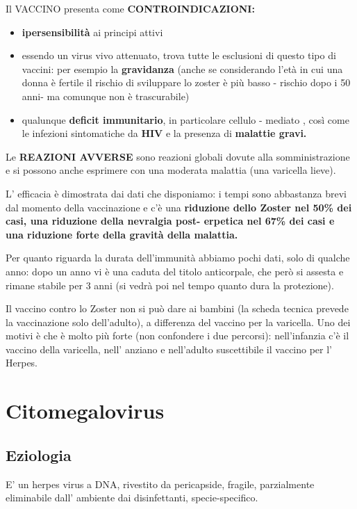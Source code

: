   Il VACCINO presenta come \textbf{CONTROINDICAZIONI:}
\begin{itemize}
\item \textbf{ipersensibilità} ai principi attivi
\item essendo un virus vivo attenuato, trova tutte le esclusioni di questo
  tipo di vaccini: per esempio la \textbf{gravidanza} (anche se
  considerando l'età in cui una donna è fertile il rischio di sviluppare
  lo zoster è più basso - rischio dopo i 50 anni- ma comunque non è
  trascurabile)
\item qualunque \textbf{deficit immunitario}, in particolare cellulo -
  mediato , così come le infezioni sintomatiche da \textbf{HIV} e la
  presenza di \textbf{malattie gravi.}
\end{itemize}
  Le \textbf{REAZIONI AVVERSE} sono reazioni globali dovute alla
  somministrazione e si possono anche esprimere con una moderata
  malattia (una varicella lieve).

  L' efficacia è dimostrata dai dati che disponiamo: i tempi sono
  abbastanza brevi dal momento della vaccinazione e c'è una
  \textbf{riduzione dello Zoster nel 50\% dei casi, una riduzione della
  nevralgia post- erpetica nel 67\% dei casi e una riduzione forte della
  gravità della malattia.}

  Per quanto riguarda la durata dell'immunità abbiamo pochi dati, solo
  di qualche anno: dopo un anno vi è una caduta del titolo anticorpale,
  che però si assesta e rimane stabile per 3 anni (si vedrà poi nel
  tempo quanto dura la protezione).

  Il vaccino contro lo Zoster non si può dare ai bambini (la scheda
  tecnica prevede la vaccinazione solo dell'adulto), a differenza del
  vaccino per la varicella. Uno dei motivi è che è molto più forte (non
  confondere i due percorsi): nell'infanzia c'è il vaccino della
  varicella, nell' anziano e nell'adulto suscettibile il vaccino per l'
  Herpes.

\section{Citomegalovirus}

\subsection{Eziologia}
  E' un herpes virus a DNA, rivestito da pericapside, fragile,
  parzialmente eliminabile dall' ambiente dai disinfettanti,
  specie-specifico.

